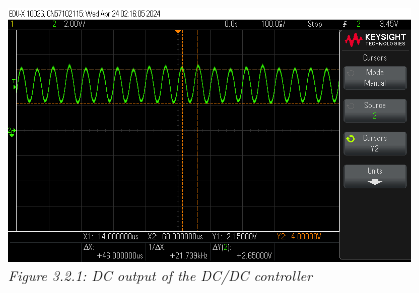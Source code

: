 \begin{center}
    \includegraphics[width=0.8\textwidth]{images/testing_oscilloscope_output.png}\\
    \it Figure 3.2.1: DC output of the DC/DC controller\\
\end{center}

